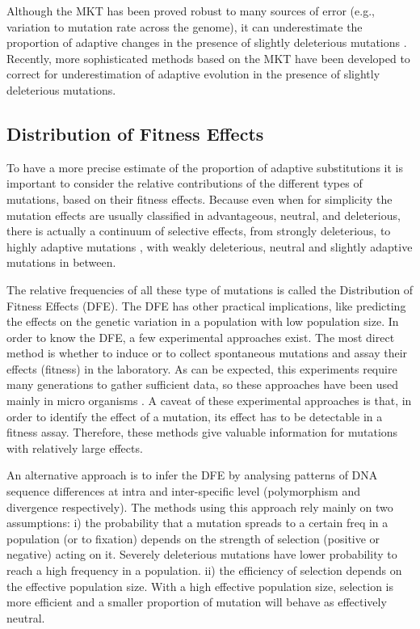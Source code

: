 Although the MKT has been proved robust to many sources of error (e.g., variation to mutation rate across the genome), it can underestimate the proportion of adaptive changes in the presence of slightly deleterious mutations
	 \citep{Messer2013,Eyre-Walker2006a}.
Recently, more sophisticated methods based on the MKT have been developed to correct for underestimation of adaptive evolution in the presence of slightly deleterious mutations. 


\subsection{Distribution of Fitness Effects}

To have a more precise estimate of the proportion of adaptive substitutions it is important to consider the relative contributions of the different types of mutations, based on their fitness effects.
Because even when for simplicity the mutation effects are usually classified in advantageous, neutral, and deleterious, there is actually a continuum of selective effects, from strongly deleterious, 
to highly adaptive mutations	
	\citep{Eyre-Walker2007},
with weakly deleterious, neutral and slightly adaptive mutations in between.

The relative frequencies of all these type of mutations is called the Distribution of Fitness Effects (DFE).
The DFE has other practical implications, like predicting the effects on the genetic variation in a population with low population size.
In order to know the DFE, a few experimental approaches exist. The most direct method is whether to induce 
	\citep{Sanjuan2004}
or to collect
	\citep{MUKAI1964}
spontaneous mutations and assay their effects (fitness) in the laboratory.
As can be expected, this experiments require many generations to gather sufficient data, so these approaches have been used mainly in micro organisms
	\citep{Eyre-Walker2007}.
A caveat of these experimental approaches is that, in order to identify the effect of a mutation, its effect has to be detectable in a fitness assay.
Therefore, these methods give valuable information for mutations with relatively large effects.

An alternative approach is to infer the DFE by analysing patterns of DNA sequence differences at intra and inter-specific level (polymorphism and divergence respectively).
The methods using this approach rely mainly on two assumptions:
i) the probability that a mutation spreads to a certain freq in a population (or to fixation) depends on the strength of selection (positive or negative) acting on it.
Severely deleterious mutations have lower probability to reach a high frequency in a population.
ii) the efficiency of selection depends on the effective population size. 
With a high effective population size, selection is more efficient and a smaller proportion of mutation will behave as effectively neutral.

